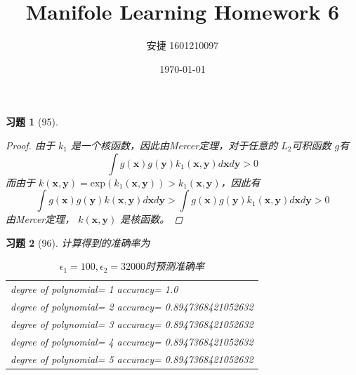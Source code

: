 \documentclass[a4paper, UTF8]{ctexart}
\title{Manifole Learning Homework 6}
\date{\today}
\author{安捷 1601210097}
\newtheorem*{exercise}{\textbf{习题}}
\begin{document}
\maketitle
  \begin{exercise}[95]
    \begin{proof}
      由于 $k_1$ 是一个核函数，因此由Mercer定理，对于任意的 $L_2$可积函数 $g$有
      \begin{equation}
        \int g \left( \mathbf{x} \right) g \left(  \mathbf{y}\right)k_1 \left( \mathbf{x}, \mathbf{y} \right) d \mathbf{x} d \mathbf{y} > 0
      \end{equation}
      而由于 $k \left( \mathbf{x}, \mathbf{y} \right) = \mathrm{exp}\left( k_1 \left( \mathbf{x}, \mathbf{y} \right) \right) > k_1 \left( \mathbf{x}, \mathbf{y} \right)$，因此有
      \begin{equation}
        \int g \left( \mathbf{x} \right) g \left( \mathbf{y} \right) k \left( \mathbf{x}, \mathbf{y} \right) d \mathbf{x} d \mathbf{y} > \int g \left( \mathbf{x} \right) g \left( \mathbf{y} \right) k_1 \left( \mathbf{x}, \mathbf{y} \right) d \mathbf{x} d \mathbf{y} > 0
      \end{equation}
      由Mercer定理， $k \left( \mathbf{x}, \mathbf{y} \right)$ 是核函数。
    \end{proof}
  \end{exercise}
  \begin{exercise}[96]
    计算得到的准确率为
    \begin{table}[htbp!]
      \centering
      \begin{tabular}{l}
        degree of polynomial= 1 accuracy= 1.0 \\
        degree of polynomial= 2 accuracy= 0.8947368421052632 \\
        degree of polynomial= 3 accuracy= 0.8947368421052632 \\
        degree of polynomial= 4 accuracy= 0.8947368421052632 \\
        degree of polynomial= 5 accuracy= 0.8947368421052632 \\
      \end{tabular}
      \caption{$\epsilon_1=100, \epsilon_2 = 32000$时预测准确率}
    \end{table}
  \end{exercise}
\end{document}
